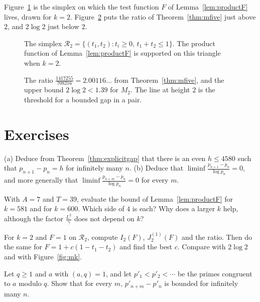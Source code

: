 Figure~\ref{fig:v14-extra-09-a} is the simplex on which the test function $F$ of Lemma~\ref{lem:productF} lives, drawn for $k=2$. Figure~\ref{fig:v14-extra-09-b} puts the ratio of Theorem~\ref{thm:mfive} just above $2$, and $2\log2$ just below $2$.

\begin{figure}[ht]
\centering
{}
\caption{The simplex $\mathcal R_2=\{(t_1,t_2):t_i\ge0,\,t_1+t_2\le1\}$. The product function of Lemma~\ref{lem:productF} is supported on this triangle when $k=2$.}
\label{fig:v14-extra-09-a}
\end{figure}

\begin{figure}[ht]
\centering
{}
\caption{The ratio $\frac{1417255}{708216}=2.00116\ldots$ from Theorem~\ref{thm:mfive}, and the upper bound $2\log2<1.39$ for $M_2$. The line at height $2$ is the threshold for a bounded gap in a pair.}
\label{fig:v14-extra-09-b}
\end{figure}

\section{Exercises}

\begin{exercise}[$\star$]\label{ex:pigeon}
(a) Deduce from Theorem~\ref{thm:explicitgap} that there is an even $h\le4580$ such that $p_{n+1}-p_n=h$ for infinitely many $n$.
(b) Deduce that $\liminf\frac{p_{n+1}-p_n}{\log p_n}=0$, and more generally that $\liminf\frac{p_{n+m}-p_n}{\log p_n}=0$ for every $m$.
\end{exercise}

\begin{exercise}[$\star$]\label{ex:mk581}
With $A=7$ and $T=39$, evaluate the bound of Lemma~\ref{lem:productF} for $k=581$ and for $k=600$. Which side of $4$ is each? Why does a larger $k$ help, although the factor $\frac{L^2}\gamma$ does not depend on $k$?
\end{exercise}

\begin{exercise}[$\star$]\label{ex:mtwo}
For $k=2$ and $F=1$ on $\mathcal R_2$, compute $I_2(F)$, $J_2^{(1)}(F)$ and the ratio. Then do the same for $F=1+c(1-t_1-t_2)$ and find the best $c$. Compare with $2\log2$ and with Figure~\ref{fig:mk}.
\end{exercise}

\begin{exercise}[$\star\star$]\label{ex:progs}
Let $q\ge1$ and $a$ with $(a,q)=1$, and let $p'_1<p'_2<\cdots$ be the primes congruent to $a$ modulo $q$. Show that for every $m$, $p'_{n+m}-p'_n$ is bounded for infinitely many $n$.
\end{exercise}

